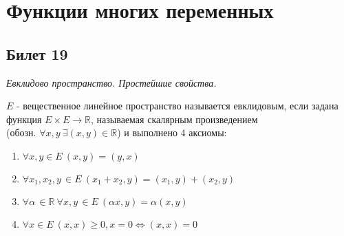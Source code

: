 \section{Функции многих переменных}
\subsection{Билет 19}


\textit{Евклидово пространство. Простейшие свойства.}


 $E$ - вещественное линейное пространство называется евклидовым, если задана функция $E \times E \to \mathbb{R}$, называемая скалярным произведением \\ 
(обозн. $\forall x, y\ \exists (x, y) \in \mathbb{R}$) и выполнено 4 аксиомы:
  \begin{enumerate}
    \item $\forall x, y \in E\ (x, y) = (y, x)$
    \item $\forall x_1, x_2, y\,\in E\ (x_1 + x_2, y) = (x_1, y) + (x_2, y) $
    \item $\forall \alpha\,\in \mathbb{R}\ \forall x, y\,\in E\ (\alpha x, y) = \alpha(x, y)$
    \item $\forall x \in E\ (x, x) \ge 0, x = 0 \Leftrightarrow (x, x) = 0$
  \end{enumerate}


